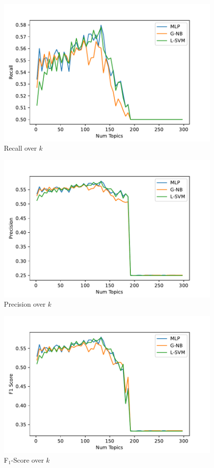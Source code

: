 \documentclass[sigconf, nonacm]{acmart}
\begin{document}
\begin{figure}
	\centering
	\includegraphics[width=\linewidth]{figures/topic_recall.pdf}
	\caption{Recall over $k$}
	\label{fig:rec}
\end{figure}

\begin{figure}
	\centering
	\includegraphics[width=\linewidth]{figures/topic_precision.pdf}
	\caption{Precision over $k$}
	\label{fig:pre}
\end{figure}

\begin{figure}
	\centering
	\includegraphics[width=\linewidth]{figures/topic_fscore.pdf}
	\caption{F$_1$-Score over $k$}
	\label{fig:f1}
\end{figure}
\end{document}
